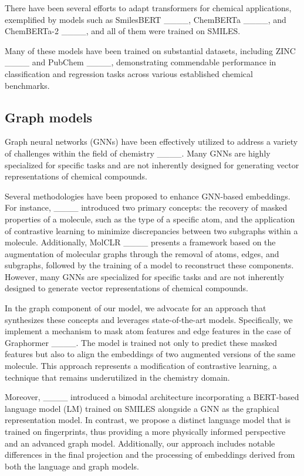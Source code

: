 There have been several efforts to adapt transformers for chemical applications, exemplified by models such as SmilesBERT ____, ChemBERTa ____, and ChemBERTa-2 ____, and all of them were trained on SMILES.

Many of these models have been trained on substantial datasets, including ZINC ____ and PubChem ____, demonstrating commendable performance in classification and regression tasks across various established chemical benchmarks.

\subsection{Graph models}

Graph neural networks (GNNs) have been effectively utilized to address a variety of challenges within the field of chemistry ____. Many GNNs are highly specialized for specific tasks and are not inherently designed for generating vector representations of chemical compounds.

Several methodologies have been proposed to enhance GNN-based embeddings. For instance, ____ introduced two primary concepts: the recovery of masked properties of a molecule, such as the type of a specific atom, and the application of contrastive learning to minimize discrepancies between two subgraphs within a molecule. Additionally, MolCLR ____ presents a framework based on the augmentation of molecular graphs through the removal of atoms, edges, and subgraphs, followed by the training of a model to reconstruct these components. However, many GNNs are specialized for specific tasks and are not inherently designed to generate vector representations of chemical compounds. 

In the graph component of our model, we advocate for an approach that synthesizes these concepts and leverages state-of-the-art models. Specifically, we implement a mechanism to mask atom features and edge features in the case of Graphormer ____. The model is trained not only to predict these masked features but also to align the embeddings of two augmented versions of the same molecule. This approach represents a modification of contrastive learning, a technique that remains underutilized in the chemistry domain.

Moreover, ____ introduced a bimodal architecture incorporating a BERT-based language model (LM) trained on SMILES alongside a GNN as the graphical representation model. In contrast, we propose a distinct language model that is trained on fingerprints, thus providing a more physically informed perspective and an advanced graph model. Additionally, our approach includes notable differences in the final projection and the processing of embeddings derived from both the language and graph models.